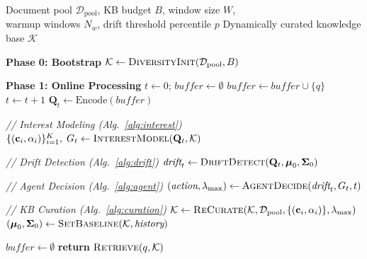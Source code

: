 
% 

\begin{algorithm}[t]
\caption{QARC: Query-Aligned Retrieval-augmented Knowledge Curation}
\label{alg:qarc}
\begin{algorithmic}[1]
\REQUIRE Document pool $\mathcal{D}_{\mathrm{pool}}$, KB budget $B$, window size $W$, \\
\quad warmup windows $N_w$, drift threshold percentile $p$
\ENSURE Dynamically curated knowledge base $\mathcal{K}$

\STATE \textbf{Phase 0: Bootstrap}
\STATE $\mathcal{K} \leftarrow \textsc{DiversityInit}(\mathcal{D}_{\mathrm{pool}}, B)$ 

\STATE \textbf{Phase 1: Online Processing}
\STATE $t \leftarrow 0$; \; $\textit{buffer} \leftarrow \emptyset$
    \STATE $\textit{buffer} \leftarrow \textit{buffer} \cup \{q\}$
        \STATE $t \leftarrow t + 1$
        \STATE $\mathbf{Q}_t \leftarrow \text{Encode}(\textit{buffer})$ 

        \STATE \textit{// Interest Modeling (Alg.~\ref{alg:interest})}
        \STATE $\{(\mathbf{c}_i, \alpha_i)\}_{i=1}^{K}, \; G_t \leftarrow \textsc{InterestModel}(\mathbf{Q}_t, \mathcal{K})$

        \STATE \textit{// Drift Detection (Alg.~\ref{alg:drift})}
        \STATE $\textit{drift}_t \leftarrow \textsc{DriftDetect}(\mathbf{Q}_t, \boldsymbol{\mu}_0, \boldsymbol{\Sigma}_0)$

        \STATE \textit{// Agent Decision (Alg.~\ref{alg:agent})}
        \STATE $(\textit{action}, \lambda_{\max}) \leftarrow \textsc{AgentDecide}(\textit{drift}_t, G_t, t)$

            \STATE \textit{// KB Curation (Alg.~\ref{alg:curation})}
            \STATE $\mathcal{K} \leftarrow \textsc{ReCurate}(\mathcal{K}, \mathcal{D}_{\mathrm{pool}}, \{(\mathbf{c}_i, \alpha_i)\}, \lambda_{\max})$
        \ENDIF
            \STATE $(\boldsymbol{\mu}_0, \boldsymbol{\Sigma}_0) \leftarrow \textsc{SetBaseline}(\mathcal{K}, \textit{history})$
        \ENDIF

        \STATE $\textit{buffer} \leftarrow \emptyset$
    \ENDIF
    \STATE \textbf{return} $\textsc{Retrieve}(q, \mathcal{K})$ 
\ENDFOR
\end{algorithmic}
\end{algorithm}


